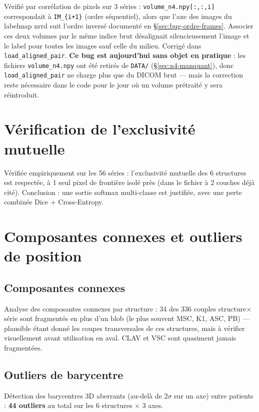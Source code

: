 Vérifié par corrélation de pixels sur 3 séries : \texttt{volume\_n4.npy[:,:,i]} correspondait à
\texttt{IM\_\{i+1\}} (ordre séquentiel), alors que l'axe des images du labelmap nrrd suit l'ordre
inversé documenté en \S\ref{sec:bug-ordre-frames}. Associer ces deux volumes par le même indice brut
désalignait silencieusement l'image et le label pour toutes les images sauf celle du milieu. Corrigé
dans \texttt{load\_aligned\_pair}. \textbf{Ce bug est aujourd'hui sans objet en pratique} : les
fichiers \texttt{volume\_n4.npy} ont été retirés de \texttt{DATA/} (\S\ref{sec:n4-manquant}), donc
\texttt{load\_aligned\_pair} ne charge plus que du DICOM brut --- mais la correction reste nécessaire
dans le code pour le jour où un volume prétraité y sera réintroduit.

\section{Vérification de l'exclusivité mutuelle}

Vérifiée empiriquement sur les 56 séries : l'exclusivité mutuelle des 6 structures est respectée, à
1 seul pixel de frontière isolé près (dans le fichier à 2 couches déjà cité). Conclusion : une sortie
softmax multi-classe est justifiée, avec une perte combinée Dice + Cross-Entropy.

\section{Composantes connexes et outliers de position}
\label{sec:composantes-connexes}

\subsection{Composantes connexes}

Analyse des composantes connexes par structure : 34 des 336 couples structure$\times$série sont
fragmentés en plus d'un blob (le plus souvent MSC, K1, ASC, PB) --- plausible étant donné les coupes
transversales de ces structures, mais à vérifier visuellement avant utilisation en aval. CLAV et VSC
sont quasiment jamais fragmentées.

\subsection{Outliers de barycentre}

Détection des barycentres 3D aberrants (au-delà de 2$\sigma$ sur un axe) entre patients : \textbf{44
outliers} au total sur les 6 structures $\times$ 3 axes.

